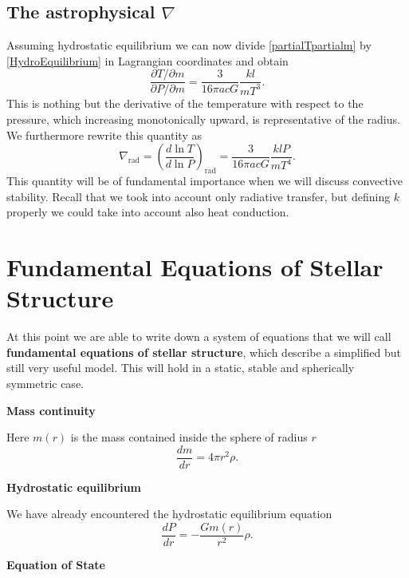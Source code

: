 \subsection{The astrophysical $\nabla$}
Assuming hydrostatic equilibrium we can now divide \ref{partialTpartialm} by \ref{HydroEquilibrium} in Lagrangian coordinates and obtain
\begin{equation}
	\frac{\partial T/\partial m}{\partial P / \partial m} = \frac{3}{16 \pi a c G} \frac{k l}{m T^3}.
\end{equation}
This is nothing but the derivative of the temperature with respect to the pressure, which increasing monotonically upward, is representative of the radius. We furthermore rewrite this quantity as
\begin{equation}\label{nablarad}
	\nabla_{\mathrm{rad}} = \left( \frac{d \ln T}{d \ln P}  \right)_{\mathrm{rad}}= \frac{3}{16 \pi a c G} \frac{k l P}{m T^4}.
\end{equation}
This quantity will be of fundamental importance when we will discuss convective stability. Recall that we took into account only radiative transfer, but defining $k$ properly we could take into account also heat conduction.
\section{Fundamental Equations of Stellar Structure}
At this point we are able to write down a system of equations that we will call \textbf{fundamental equations of stellar structure}, which describe a simplified but still very useful model. This will hold in a static, stable and spherically symmetric case.

\textbf{Mass continuity} 

Here $m(r)$ is the mass contained inside the sphere of radius $r$
\begin{equation}\label{masscons}
	\frac{dm}{dr}=4 \pi r^2 \rho.
\end{equation}

\textbf{Hydrostatic equilibrium} 

We have already encountered the hydrostatic equilibrium equation
\begin{equation}\label{hydroeq}
	\frac{dP}{dr}= - \frac{G m(r)}{r^2} \rho.
\end{equation}

\textbf{Equation of State} 

